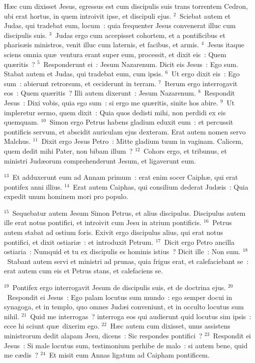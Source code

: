 \lettrine[lines=3,image=true,loversize=0.05,lraise=-0.03]{H}{}\ae c cum dixisset Jesus, egressus est cum discipulis suis trans torrentem Cedron, ubi erat hortus, in quem introivit ipse, et discipuli ejus.
${}^{2}$~Sciebat autem et Judas, qui tradebat eum, locum~: quia frequenter Jesus convenerat illuc cum discipulis suis.
${}^{3}$~Judas ergo cum accepisset cohortem, et a pontificibus et pharis\ae is ministros, venit illuc cum laternis, et facibus, et armis.
${}^{4}$~Jesus itaque sciens omnia qu\ae\ ventura erant super eum, processit, et dixit eis~: Quem qu\ae ritis~?
${}^{5}$~Responderunt ei~: Jesum Nazarenum. Dicit eis Jesus~: Ego sum. Stabat autem et Judas, qui tradebat eum, cum ipsis.
${}^{6}$~Ut ergo dixit eis~: Ego sum~: abierunt retrorsum, et ceciderunt in terram.
${}^{7}$~Iterum ergo interrogavit eos~: Quem qu\ae ritis~? Illi autem dixerunt~: Jesum Nazarenum.
${}^{8}$~Respondit Jesus~: Dixi vobis, quia ego sum~: si ergo me qu\ae ritis, sinite hos abire.
${}^{9}$~Ut impleretur sermo, quem dixit~: Quia quos dedisti mihi, non perdidi ex eis quemquam.
${}^{10}$~Simon ergo Petrus habens gladium eduxit eum~: et percussit pontificis servum, et abscidit auriculam ejus dexteram. Erat autem nomen servo Malchus.
${}^{11}$~Dixit ergo Jesus Petro~: Mitte gladium tuum in vaginam. Calicem, quem dedit mihi Pater, non bibam illum~?
${}^{12}$~Cohors ergo, et tribunus, et ministri Jud\ae orum comprehenderunt Jesum, et ligaverunt eum.


${}^{13}$~Et adduxerunt eum ad Annam primum~: erat enim socer Caiph\ae , qui erat pontifex anni illius.
${}^{14}$~Erat autem Caiphas, qui consilium dederat Jud\ae is~: Quia expedit unum hominem mori pro populo.


${}^{15}$~Sequebatur autem Jesum Simon Petrus, et alius discipulus. Discipulus autem ille erat notus pontifici, et introivit cum Jesu in atrium pontificis.
${}^{16}$~Petrus autem stabat ad ostium foris. Exivit ergo discipulus alius, qui erat notus pontifici, et dixit ostiari\ae~: et introduxit Petrum.
${}^{17}$~Dicit ergo Petro ancilla ostiaria~: Numquid et tu ex discipulis es hominis istius~? Dicit ille~: Non sum.
${}^{18}$~Stabant autem servi et ministri ad prunas, quia frigus erat, et calefaciebant se~: erat autem cum eis et Petrus stans, et calefaciens se.


${}^{19}$~Pontifex ergo interrogavit Jesum de discipulis suis, et de doctrina ejus.
${}^{20}$~Respondit ei Jesus~: Ego palam locutus sum mundo~: ego semper docui in synagoga, et in templo, quo omnes Jud\ae i conveniunt, et in occulto locutus sum nihil.
${}^{21}$~Quid me interrogas~? interroga eos qui audierunt quid locutus sim ipsis~: ecce hi sciunt qu\ae\ dixerim ego.
${}^{22}$~H\ae c autem cum dixisset, unus assistens ministrorum dedit alapam Jesu, dicens~: Sic respondes pontifici~?
${}^{23}$~Respondit ei Jesus~: Si male locutus sum, testimonium perhibe de malo~: si autem bene, quid me c\ae dis~?
${}^{24}$~Et misit eum Annas ligatum ad Caipham pontificem.


